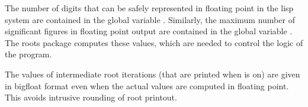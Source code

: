The number of digits that can be safely represented in floating point in
the lisp system are contained in the global variable .
Similarly, the maximum number of significant figures in floating point
output are contained in the global variable .  The roots
package computes these values, which are needed to control the logic of
the program.  

The values of intermediate root iterations (that are printed when  
is on) are given in bigfloat format even when the actual values
are computed in floating point.  This avoids intrusive rounding of root
printout.


